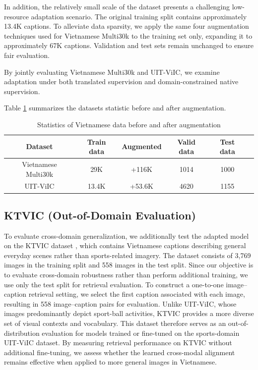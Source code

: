 In addition, the relatively small scale of the dataset presents a challenging low-resource adaptation scenario. The original training split contains approximately 13.4K captions. To alleviate data sparsity, we apply the same four augmentation techniques used for Vietnamese Multi30k to the training set only, expanding it to approximately 67K captions. Validation and test sets remain unchanged to ensure fair evaluation.

By jointly evaluating Vietnamese Multi30k and UIT-ViIC, we examine adaptation under both translated supervision and domain-constrained native supervision.



Table \ref{tab:dataset-stats} summarizes the datasets statistic before and after augmentation.
\begin{table}[ht]
\centering
\caption{Statistics of Vietnamese data before and after augmentation}
\label{tab:dataset-stats}
\begin{tabular}{|c|c|c|c|c|c|}
\hline
\textbf{Dataset} & \textbf{Train data}  & \textbf{Augmented} & \textbf{Valid data} & \textbf{Test data} \\
\hline
Vietnamese Multi30k & 29K & +116K  & 1014 & 1000 \\ 
\hline
UIT-ViIC & 13.4K & +53.6K & 4620 & 1155 \\ 
\hline
\end{tabular}
\end{table}
\subsection{KTVIC (Out-of-Domain Evaluation)}


To evaluate cross-domain generalization, we additionally test the adapted model on the KTVIC dataset \cite{pham2024ktvicvietnameseimagecaptioning}, which contains Vietnamese captions describing general everyday scenes rather than sports-related imagery. The dataset consists of 3,769 images in the training split and 558 images in the test split. Since our objective is to evaluate cross-domain robustness rather than perform additional training, we use only the test split for retrieval evaluation. To construct a one-to-one image–caption retrieval setting, we select the first caption associated with each image, resulting in 558 image–caption pairs for evaluation. Unlike UIT-ViIC, whose images predominantly depict sport-ball activities, KTVIC provides a more diverse set of visual contexts and vocabulary. This dataset therefore serves as an out-of-distribution evaluation for models trained or fine-tuned on the sports-domain UIT-ViIC dataset. By measuring retrieval performance on KTVIC without additional fine-tuning, we assess whether the learned cross-modal alignment remains effective when applied to more general images in Vietnamese.

